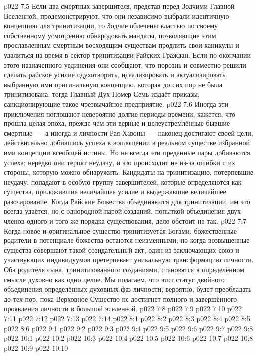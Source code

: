 \vs p022 7:5 Если два смертных завершителя, представ перед Зодчими Главной Вселенной, продемонстрируют, что они независимо выбрали идентичную концепцию для тринитизации, то Зодчие облечены властью по своему собственному усмотрению обнародовать мандаты, позволяющие этим прославленным смертным восходящим существам продлить свои каникулы и удалиться на время в сектор тринитизации Райских Граждан. Если по окончании этого назначенного уединения они сообщают, что порознь и совместно решили сделать райское усилие одухотворить, идеализировать и актуализировать выбранную ими оригинальную концепцию, которая до сих пор не была тринитизована, тогда Главный Дух Номер Семь издаёт приказы, санкционирующие такое чрезвычайное предприятие.
\vs p022 7:6 Иногда эти приключения поглощают невероятно долгие периоды времени; кажется, что прошла целая эпоха, прежде чем эти верные и целеустремлённые бывшие смертные~--- а иногда и личности Рая\hyp{}Хавоны~--- наконец достигают своей цели, действительно добившись успеха в воплощении в реальном существе избранной ими концепции всеобщей истины. Но не всегда эти преданные пары добиваются успеха; нередко они терпят неудачу, и это происходит не из\hyp{}за ошибки с их стороны, которую можно обнаружить. Кандидаты на тринитизацию, потерпевшие неудачу, попадают в особую группу завершителей, которые определяются как существа, приложившие величайшее усилие и выдержавшие величайшее разочарование. Когда Райские Божества объединяются для тринитизации, им это всегда удаётся, но с однородной парой созданий, попыткой объединения двух членов одного и того же порядка существования, дело обстоит не так.
\vs p022 7:7 \pc Когда новое и оригинальное существо тринитизуется Богами, божественные родители в потенциале божества остаются неизменными; но когда возвышенные существа совершают такой созидательный акт, один из заключающих союз и участвующих индивидуумов претерпевает уникальную трансформацию личности. Оба родителя сына, тринитизованного созданиями, становятся в определённом смысле духовно как одно целое. Мы полагаем, что этот статус двойного объединения определённых духовных фаз личности, вероятно, будет преобладать до тех пор, пока Верховное Существо не достигнет полного и завершённого проявления личности в большой вселенной.
\vs p022 7:8 
\vs p022 7:9 
\vs p022 7:10 \pc 
\vs p022 7:11 \pc 
\vs p022 7:12 
\vs p022 7:13 
\vs p022 7:14 
\vs p022 8:1 
\vs p022 8:2 \pc 
\vs p022 8:3 
\vs p022 8:4 
\vs p022 8:5 
\vs p022 8:6 
\vs p022 9:1 
\vs p022 9:2 
\vs p022 9:3 \pc 
\vs p022 9:4 
\vs p022 9:5 \pc 
\vs p022 9:6 
\vs p022 9:7 
\vs p022 9:8 
\vs p022 10:1 
\vs p022 10:2 \pc 
\vs p022 10:3 
\vs p022 10:4 \pc 
\vs p022 10:5 \pc 
\vs p022 10:6 
\vs p022 10:7 \pc 
\vs p022 10:8 
\vs p022 10:9 \pc 
\vsetoff
\vs p022 10:10 
\quizlink
